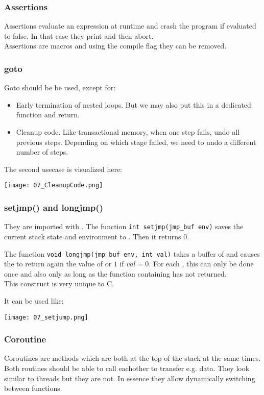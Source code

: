 \subsubsection{Assertions}
Assertions evaluate an expression at runtime and crash the program if evaluated to false. In that case they print  and then abort.\\
Assertions are macros and using the compile flag  they can be removed.

\subsubsection{goto}
Goto should be be used, except for:
\begin{itemize}
    \item Early termination of nested loops. But we may also put this in a dedicated function and return.
    \item Cleanup code. Like transactional memory, when one step fails, undo all previous steps. Depending on which stage failed, we need to undo a different number of steps.
\end{itemize}

The second usecase is visualized here:

\texttt{[image: 07\_CleanupCode.png]}

\subsubsection{setjmp() and longjmp()}
They are imported with . The function \verb+int setjmp(jmp_buf env)+ saves the current stack state and environment to . Then it returns $0$.

The function \verb+void longjmp(jmp_buf env, int val)+ takes a buffer of  and causes the  to return again the value of  or $1$ if $val = 0$. For each , this can only be done once and also only as long as the function containing  has not returned.\\
This construct is very unique to C.

It can be used like:

\texttt{[image: 07\_setjump.png]}

\subsubsection{Coroutine}
Coroutines are methods which are both at the top of the stack at the same times. Both routines should be able to call eachother to transfer e.g. data. They look similar to threads but they are not. In essence they allow dynamically switching between functions.

